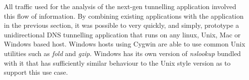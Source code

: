 \documentclass[12pt]{report}
\theoremstyle{remark}
\theoremstyle{definition}
\theoremstyle{definition}
\theoremstyle{definition}
\begin{document}
\begin{appendices}
All traffic used for the analysis of the next-gen tunnelling application
involved this flow of information. By combining existing applications with the
application in the previous section, it was possible to very quickly, and
simply, prototype a unidirectional DNS tunnelling application that runs on any
linux, Unix, Mac or Windows based host. Windows hosts using Cygwin are able to use
common Unix utilities such as \emph{fold} and \emph{gzip}. Windows has its own version of
\emph{nslookup} bundled with it that has sufficiently similar behaviour to the Unix
style version as to support this use case.

\end{appendices}

\newpage
{}

%
%
\end{document}
